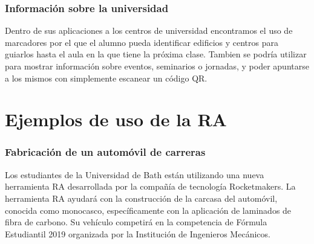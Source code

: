     
\subsubsection{Información sobre la universidad}  

Dentro de sus aplicaciones a los centros de universidad encontramos el uso de marcadores por el que el alumno pueda identificar edificios y centros para guiarlos hasta el aula en la que tiene la próxima clase. Tambien se podría utilizar para mostrar información sobre eventos, seminarios o jornadas, y poder apuntarse a los mismos con simplemente escanear un código QR.




\section{Ejemplos de uso de la RA}

\subsubsection{Fabricación de un automóvil de carreras} 

Los estudiantes de la Universidad de Bath están utilizando una nueva herramienta RA desarrollada por la compañía de tecnología Rocketmakers. La herramienta RA ayudará con la construcción de la carcasa del automóvil, conocida como monocasco, específicamente con la aplicación de laminados de fibra de carbono. Su vehículo competirá en la competencia de Fórmula Estudiantil 2019 organizada por la Institución de Ingenieros Mecánicos.

